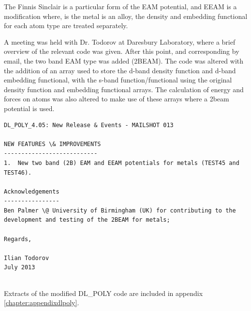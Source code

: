 The Finnis Sinclair is a particular form of the EAM potential, and EEAM is a modification where, is the metal is an alloy, the density and embedding functional for each atom type are treated separately.

A meeting was held with Dr. Todorov at Daresbury Laboratory, where a brief overview of the relevant code was given.  After this point, and corresponding by email, the two band EAM type was added (2BEAM).  The code was altered with the addition of an array used to store the d-band density function and d-band embedding functional, with the s-band function/functional using the original density function and embedding functional arrays.  The calculation of energy and forces on atoms was also altered to make use of these arrays where a \acrlong{2beam} potential is used.

\begin{lstlisting}[style=sEmail,caption={DL\_POLY 4.05 mailshot extract}]
DL_POLY_4.05: New Release & Events - MAILSHOT 013

NEW FEATURES \& IMPROVEMENTS
--------------------------- 
1.  New two band (2B) EAM and EEAM potentials for metals (TEST45 and TEST46). 

Acknowledgements
----------------
Ben Palmer \@ University of Birmingham (UK) for contributing to the
development and testing of the 2BEAM for metals;

Regards,

Ilian Todorov
July 2013 


\end{lstlisting}

Extracts of the modified DL\_POLY code are included in appendix \ref{chapter:appendixdlpoly}.



